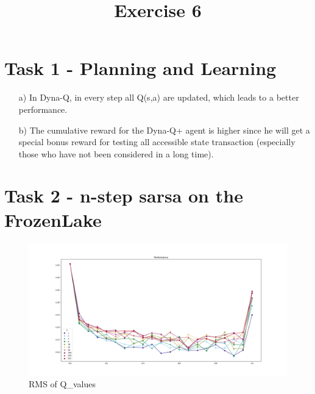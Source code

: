 \documentclass[a4paper]{article}
\date{}
\author{}
\title{\textbf{Exercise 6}}
\begin{document}
\maketitle 
\thispagestyle{fancy}

\section*{Task 1 - Planning and Learning}

\begin{enumerate}
	\item[a)] In Dyna-Q, in every step all Q(s,a) are updated, which leads to a better performance.
	\item[b)] The cumulative reward for the Dyna-Q+ agent is higher since he will get a special bonus reward for testing all accessible state transaction (especially those who have not been considered in a long time). 
\end{enumerate}

\section*{Task 2 - n-step sarsa on the FrozenLake}
\begin{figure}[!ht]
	\centering
	\includegraphics[width=0.7\linewidth]{ex6_2}
	\caption{RMS of Q\_values}
	\label{fig:ex62}
\end{figure}
\end{document}
